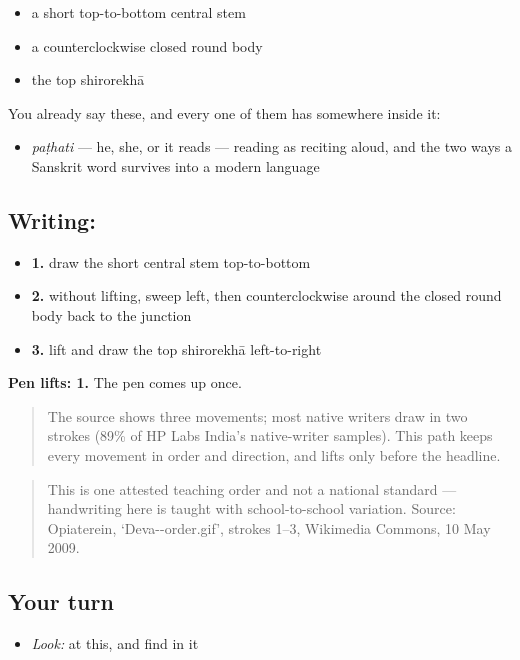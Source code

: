 \begin{itemize}
\raggedright
  \item a short top-to-bottom central stem
  \item a counterclockwise closed round body
  \item the top shirorekhā
\end{itemize}

You already say these, and every one of them has  somewhere inside it:

\begin{itemize}
\raggedright
  \item \textbf{} \emph{paṭhati} — he, she, or it reads — reading as reciting aloud, and the two ways a Sanskrit word survives into a modern language
\end{itemize}

\subsection*{Writing: }

\begin{itemize}
\raggedright
  \item \textbf{1.} draw the short central stem top-to-bottom
  \item \textbf{2.} without lifting, sweep left, then counterclockwise around the closed round body back to the junction
  \item \textbf{3.} lift and draw the top shirorekhā left-to-right
\end{itemize}

\textbf{Pen lifts: 1.} The pen comes up once.

\begin{quote}
The source shows three movements; most native writers draw  in two strokes (89\% of HP Labs India's native-writer samples). This path keeps every movement in order and direction, and lifts only before the headline.
\end{quote}

\begin{quote}
This is one attested teaching order and not a national standard — handwriting here is taught with school-to-school variation. Source: Opiaterein, ‘Deva--order.gif’, strokes 1–3, Wikimedia Commons, 10 May 2009.
\end{quote}

\subsection*{Your turn}
\begin{itemize}
\raggedright
  \item \emph{Look:} at this, and find  in it
\end{itemize}

